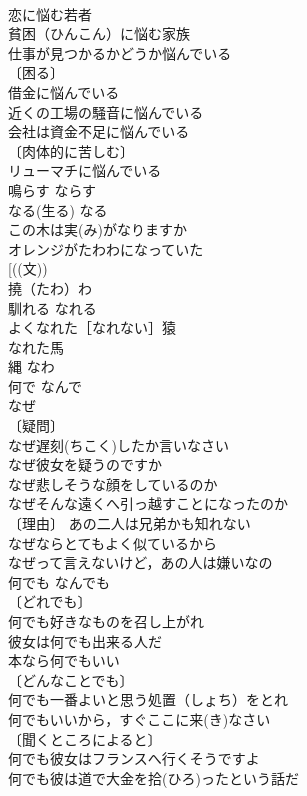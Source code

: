 \documentclass[8pt]{extreport}
\begin{document}
\begin{CJK}{UTF8}{min}
\\	恋に悩む若者 
\\	貧困（ひんこん）に悩む家族 
\\	仕事が見つかるかどうか悩んでいる 
\\	〔困る〕
\\	借金に悩んでいる 
\\	近くの工場の騒音に悩んでいる 
\\	会社は資金不足に悩んでいる 
\\	〔肉体的に苦しむ〕
\\	リューマチに悩んでいる 
\\	鳴らす	ならす	
\\	なる(生る)	なる	
\\	この木は実(み)がなりますか 
\\	オレンジがたわわになっていた 
\\	[((文)) 
\\	撓（たわ）わ　
\\	馴れる	なれる	
\\	よくなれた［なれない］猿 
\\	なれた馬 
\\	縄	なわ	
\\	何で	なんで　
\\	なぜ	
\\	〔疑問〕
\\	なぜ遅刻(ちこく)したか言いなさい 
\\	なぜ彼女を疑うのですか 
\\	なぜ悲しそうな顔をしているのか 
\\	なぜそんな遠くへ引っ越すことになったのか 
\\	〔理由〕 あの二人は兄弟かも知れない
\\	なぜならとてもよく似ているから 
\\	なぜって言えないけど，あの人は嫌いなの 
\\	何でも	なんでも	
\\	〔どれでも〕
\\	何でも好きなものを召し上がれ 
\\	彼女は何でも出来る人だ 
\\	本なら何でもいい 
\\	〔どんなことでも〕
\\	何でも一番よいと思う処置（しょち）をとれ 
\\	何でもいいから，すぐここに来(き)なさい 
\\	〔聞くところによると〕　 
\\	何でも彼女はフランスへ行くそうですよ 
\\	何でも彼は道で大金を拾(ひろ)ったという話だ 

\end{CJK}
\end{document}
